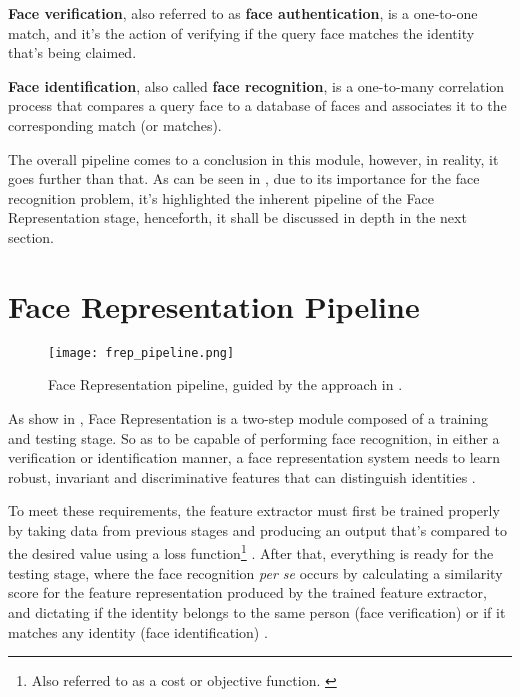 \documentclass[class=report, crop=false, a4paper, 12pt]{standalone}
\begin{document}
\vspace{0.7\baselineskip}
\noindent\textbf{Face verification}, also referred to as \textbf{face authentication}, is a one-to-one match, and it's the action of verifying if the query face matches the identity that's being claimed.  \autocite{liHandbookFaceRecognition2011}

\vspace{0.7\baselineskip}
\noindent\textbf{Face identification}, also called \textbf{face recognition}, is a one-to-many correlation process that compares a query face to a database of faces and associates it to the corresponding match (or matches).  \autocite{liHandbookFaceRecognition2011}

\vspace{0.7\baselineskip}
\par The overall pipeline comes to a conclusion in this module, however, in reality, it goes further than that. As can be seen in , due to its importance for the face recognition problem, it's highlighted the inherent pipeline of the Face Representation stage, henceforth, it shall be discussed in depth in the next section.

\newpage
\section{Face Representation Pipeline}
\begin{figure}[!h]
    \centering
    \texttt{[image: frep\_pipeline.png]}
    \caption[Pipeline]{Face Representation pipeline, guided by the approach in \autocite{wangDeepFaceRecognition2021}.}
    \label{fig:frep pipeline}
\end{figure}

\par As show in , Face Representation is a two-step module composed of a training and testing stage. So as to be capable of performing face recognition, in either a verification or identification manner, a face representation system needs to learn robust, invariant and discriminative features that can distinguish identities \autocite{ranjanDeepLearningUnderstanding2018}. 
\par To meet these requirements, the feature extractor must first be trained properly by taking data from previous stages and producing an output that's compared to the desired value using a loss function\footnote{Also referred to as a cost or objective function. \autocite{lecunDeepLearning2015}} \autocite{lecunDeepLearning2015, wangDeepFaceRecognition2021}. After that, everything is ready for the testing stage, where the face recognition \textit{per se} occurs by calculating a similarity score for the feature representation produced by the trained feature extractor, and dictating if the identity belongs to the same person (face verification) or if it matches any identity (face identification) \autocite{ranjanDeepLearningUnderstanding2018}.
\end{document}
